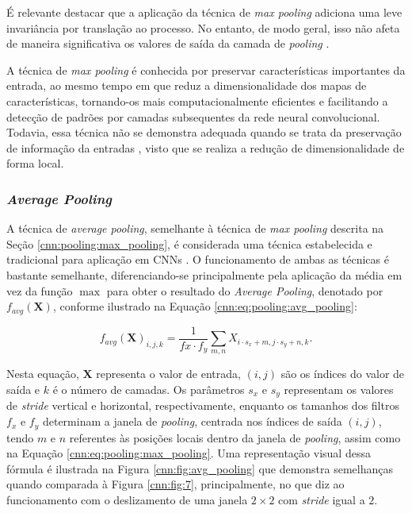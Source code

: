 É relevante destacar que a aplicação da técnica de \textit{max pooling} adiciona uma leve invariância por translação ao processo. No entanto, de modo geral, isso não afeta de maneira significativa os valores de saída da camada de \textit{pooling} \citep{Boureau2010ARecognition}.

A técnica de \textit{max pooling} é conhecida por preservar características importantes da entrada, ao mesmo tempo em que reduz a dimensionalidade dos mapas de características, tornando-os mais computacionalmente eficientes e facilitando a detecção de padrões por camadas subsequentes da rede neural convolucional. Todavia, essa técnica não se demonstra adequada quando se trata da preservação de informação da entradas \citep{Liu2019Multi-LevelNetworks}, visto que se realiza a redução de dimensionalidade de forma local.

\subsubsection{\textit{Average Pooling}}
\label{cnn:pooling:avg_pooling}
A técnica de \textit{average pooling}, semelhante à técnica de \textit{max pooling} descrita na Seção \ref{cnn:pooling:max_pooling}, é considerada uma técnica estabelecida e tradicional para aplicação em CNNs \citep{Zafar2022ANetworks, Paul2019DimensionalityPooling}. O funcionamento de ambas as técnicas é bastante semelhante, diferenciando-se principalmente pela aplicação da média em vez da função $\max$ para obter o resultado do \textit{Average Pooling}, denotado por $f_{avg}(\boldsymbol{X})$, conforme ilustrado na Equação \ref{cnn:eq:pooling:avg_pooling}:

\begin{equation}
    \label{cnn:eq:pooling:avg_pooling}
    f_{avg}(\boldsymbol{X})_{i, j, k} = \frac{1}{f{x} \cdot f_{y}} \sum_{m, n} X_{i \cdot s_x + m, j \cdot s_{y} + n, k}.
\end{equation}

Nesta equação, $\boldsymbol{X}$ representa o valor de entrada, $(i, j)$ são os índices do valor de saída e $k$ é o número de camadas. Os parâmetros $s_x$ e $s_y$ representam os valores de \textit{stride} vertical e horizontal, respectivamente, enquanto os tamanhos dos filtros $f_x$ e $f_y$ determinam a janela de \textit{pooling}, centrada nos índices de saída $(i,j)$, tendo $m$ e $n$ referentes às posições locais dentro da janela de \textit{pooling}, assim como na Equação \ref{cnn:eq:pooling:max_pooling}. Uma representação visual dessa fórmula é ilustrada na Figura \ref{cnn:fig:avg_pooling} que demonstra semelhanças quando comparada à Figura \ref{cnn:fig:7}, principalmente, no que diz ao funcionamento com o deslizamento de uma janela $2 \times 2$ com \textit{stride} igual a $2$.

